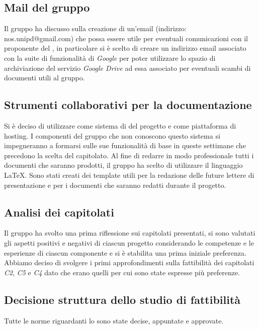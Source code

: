 \subsection{Mail del gruppo}
Il gruppo ha discusso sulla creazione di un'email (indirizzo: nos.unipd@gmail.com) che possa essere utile per eventuali comunicazioni con il proponente del , in particolare si è scelto di creare un indirizzo email associato con la suite di funzionalità di \textit{Google} per poter utilizzare lo spazio di archiviazione del servizio \textit{Google Drive} ad essa associato per eventuali scambi di documenti utili al gruppo.

\subsection{Strumenti collaborativi per la documentazione}
Si è deciso di utilizzare  come sistema di  del progetto e  come piattaforma di hosting. I componenti del gruppo che non conoscono questo sistema si impegneranno a formarsi sulle sue funzionalità di base in queste settimane che precedono la scelta del capitolato. Al fine di redarre in modo professionale tutti i documenti che saranno prodotti, il gruppo ha scelto di utilizzare il linguaggio \LaTeX . Sono stati creati dei template utili per la redazione delle future lettere di presentazione e per i documenti che saranno redatti durante il progetto.

\subsection{Analisi dei capitolati}
Il gruppo ha svolto una prima riflessione sui capitolati presentati, si sono valutati gli aspetti positivi e negativi di ciascun progetto considerando le competenze e le esperienze di ciascun componente e si è stabilita una prima iniziale preferenza.
Abbiamo deciso di svolgere i primi approfondimenti sulla fattibilità dei capitolati \textit{C2}, \textit{C5} e \textit{C4} dato che erano quelli per cui sono state espresse più preferenze.

\subsection{Decisione struttura dello studio di fattibilità}
Tutte le norme riguardanti lo \textit{\SdF} sono state decise, appuntate e approvate.

